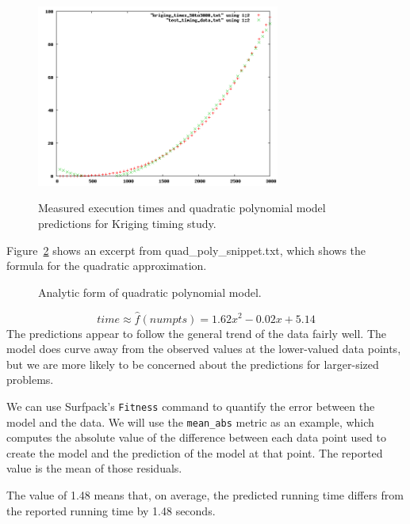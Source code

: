 \documentclass{article}
\begin{document}
\begin{figure}[htbp]
  \centering 
  \includegraphics[width=8cm]{TimingMatrixOp/timing_poly2.png}
  \label{fig:timing_poly2}
  \caption{ Measured execution times and quadratic polynomial model predictions for Kriging timing study.}
\end{figure}

Figure~\ref{fig:timing_poly2_extract} shows an excerpt from quad\_poly\_snippet.txt, which shows the
formula for the quadratic approximation.
\begin{figure}[htbp]
  \centering
  \begin{bigbox}
	\begin{small}
	
 	\end{small}
  \end{bigbox}
   \label{fig:timing_poly2_extract}
   \caption{ Analytic form of quadratic polynomial model. }
\end{figure}
\[ time \approx \hat{f}(numpts) = 1.62x^2 - 0.02x + 5.14 \]
The predictions appear to follow the general trend of the data fairly well.  The
model does curve away from the observed values at the lower-valued data points,
but we are more likely to be concerned about the predictions for larger-sized
problems.

We can use Surfpack's \texttt{Fitness} command to quantify the error between the model
and the data.  We will use the \texttt{mean\_abs} metric as an example, which computes
the absolute value of the difference between each data point used to create the
model and the prediction of the model at that point.  The reported value is the
mean of those residuals.


The value of 1.48 means that, on average, the predicted running time differs
from the reported running time by 1.48 seconds.  
\end{document}
